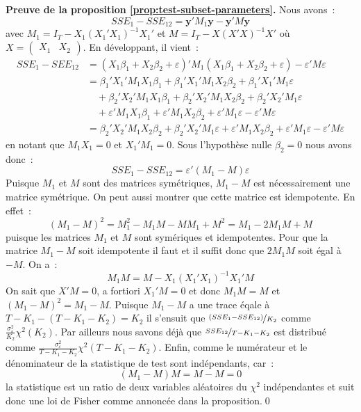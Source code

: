 \documentclass[10pt]{beamer}
\theoremstyle{plain}
\begin{document}
\begin{notes}

  \textbf{Preuve de la proposition \ref{prop:test-subset-parameters}.} Nous avons~:
  \[
    SSE_1 - SSE_{12} = \mathbf y' M_1\mathbf y - \mathbf y' M \mathbf y
  \]
  avec $M_1 = I_{T}-X_1(X_1'X_1)^{-1}X_1'$ et $M = I_{T}-X(X'X)^{-1}X'$ où  $X = \begin{pmatrix}X_1 & X_2\end{pmatrix}$. En développant, il vient~:
  \[
    \begin{split}
      SSE_1 - SEE_{12} &= \left(X_1\beta_1 + X_2\beta_2 + \varepsilon\right)'M_1\left(X_1\beta_1 + X_2\beta_2 + \varepsilon\right) - \varepsilon'M\varepsilon\\
                       &= \beta_1'X_1'M_1X_1\beta_1 + \beta_1'X_1'M_1X_2\beta_2+ \beta_1'X_1'M_1\varepsilon\\
                       &\quad + \beta_2'X_2'M_1X_1\beta_1 + \beta_2'X_2'M_1X_2\beta_2+ \beta_2'X_2'M_1\varepsilon\\
                       &\quad + \varepsilon'M_1X_1\beta_1 + \varepsilon'M_1X_2\beta_2+ \varepsilon'M_1\varepsilon - \varepsilon'M\varepsilon\\
      &= \beta_2'X_2'M_1X_2\beta_2 + \beta_2'X_2'M_1\varepsilon + \varepsilon'M_1X_2\beta_2 + \varepsilon'M_1\varepsilon - \varepsilon'M\varepsilon
    \end{split}
  \]
  en notant que $M_1X_1=0$ et $X_1'M_1 = 0$. Sous l'hypothèse nulle $\beta_2=0$ nous avons donc~:
  \[
    SSE_1 - SSE_{12} = \varepsilon'\left( M_1 - M \right)\varepsilon
  \]
  Puisque $M_1$ et $M$ sont des matrices symétriques, $M_1-M$ est nécessairement une matrice symétrique. On peut aussi montrer que cette matrice est idempotente. En effet~:
  \[
    \left( M_1-M \right)^2 = M_1^2 - M_1M - MM_1 + M^2 = M_1 - 2M_1M + M
  \]
  puisque les matrices $M_1$ et $M$ sont symériques et idempotentes. Pour que la matrice $M_1-M$ soit idempotente il faut et il suffit donc que $2M_1M$ soit égal à $-M$. On a~:
  \[
    M_1M = M - X_1(X_1'X_1)^{-1}X_1'M
  \]
  On sait que $X'M=0$, a fortiori $X_1'M = 0$ et donc $M_1M=M$ et $\left(M_1-M\right)^2=M_1-M$. Puisque $M_1-M$ a une trace éqale à $T-K_1-(T-K_1-K_2)=K_2$ il s'ensuit que $\nicefrac{\left(SSE_1-SSE_{12} \right)}{K_2}$ comme $\frac{\sigma_{\varepsilon}^2}{K_2}\chi^2(K_2)$. Par ailleurs nous savons déjà que $\nicefrac{SSE_{12}}{T-K_1-K_2}$ est distribué comme $\frac{\sigma_{\varepsilon}^2}{T-K_1-K_2}\chi^2(T-K_1-K_2)$. Enfin, comme le numérateur et le dénominateur de la statistique de test sont indépendants, car~:
  \[
    (M_1-M)M = M - M = 0
  \]
la statistique est un ratio de deux variables aléatoires du $\chi^2$ indépendantes et suit donc une loi de Fisher comme annoncée dans la proposition.\qed

\end{notes}
\end{document}
